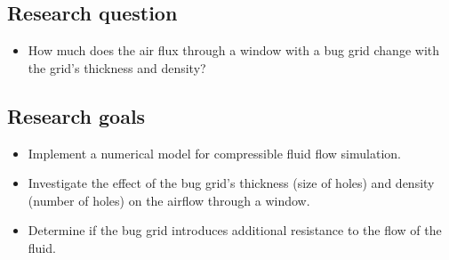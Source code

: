 \subsection{Research question}
\begin{itemize}
    \item How much does the air flux through a window with a bug grid change with the grid's thickness and density?
\end{itemize}

\subsection{Research goals}
\begin{itemize}
    \item Implement a numerical model for compressible fluid flow simulation.
    \item Investigate the effect of the bug grid's thickness (size of holes) and density (number of holes) on the airflow through a window.
    \item Determine if the bug grid introduces additional resistance to the flow of the fluid.
\end{itemize}